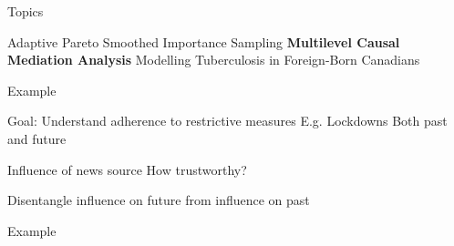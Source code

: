 \documentclass[14pt]{beamer}
\begin{document}
\begin{frame}{Topics}
    \begin{outline}
        \1 Adaptive Pareto Smoothed Importance Sampling \newline
        \1 \textbf{Multilevel Causal Mediation Analysis} \newline
        \1 Modelling Tuberculosis in Foreign-Born Canadians
    \end{outline}
\end{frame}


\begin{frame}{Example}
    \begin{outline}
        \1 Goal: Understand adherence to restrictive measures
            \2 E.g. Lockdowns
            \2 Both past and future \newline

        \1 Influence of news source
            \2 How trustworthy? \newline

        \1 Disentangle influence on future from influence on past  
    \end{outline}  
\end{frame}


\begin{frame}{Example}
        \begin{figure}[H]
    \end{figure}
\end{frame}
\end{document}
